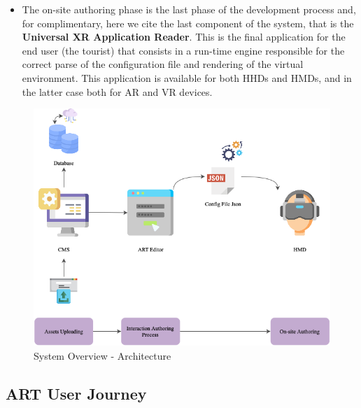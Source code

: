 \begin{itemize}
    \item The on-site authoring phase is the last phase of the development process and, for complimentary, here we cite the last component of the system, that is the \textbf{Universal \gls{XR} Application Reader}. This is the final application for the end user (the tourist) that consists in a run-time engine responsible for the correct parse of the configuration file and rendering of the virtual environment. This application is available for both \glspl{HHD} and \glspl{HMD}, and in the latter case both for \gls{AR} and \gls{VR} devices.
\end{itemize}

\begin{figure}[h]
    \centering
    \includegraphics[width=\textwidth]{Figures/Editor/architecture.png}
    \caption{System Overview - Architecture}
    \label{fig:architecture}
\end{figure}

\subsection{ART User Journey}
\label{subsec:art-user-journey}

